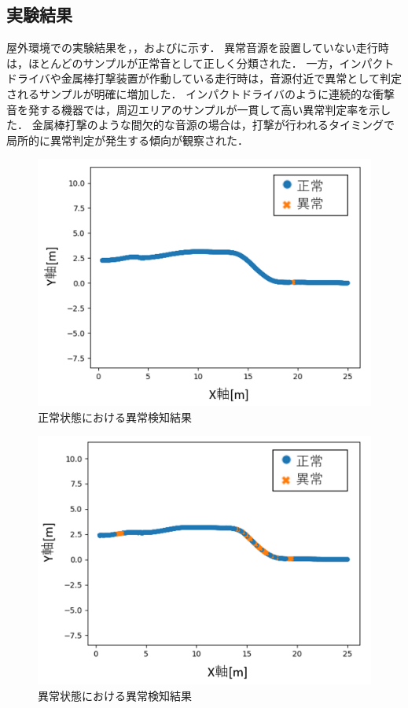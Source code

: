 \documentclass[../main]{subfiles}
\begin{document}
\subsection{実験結果}
\label{subsec:vexp_ci_result}
屋外環境での実験結果を，，およびに示す．
異常音源を設置していない走行時は，ほとんどのサンプルが正常音として正しく分類された．
一方，インパクトドライバや金属棒打撃装置が作動している走行時は，音源付近で異常として判定されるサンプルが明確に増加した．
インパクトドライバのように連続的な衝撃音を発する機器では，周辺エリアのサンプルが一貫して高い異常判定率を示した．
金属棒打撃のような間欠的な音源の場合は，打撃が行われるタイミングで局所的に異常判定が発生する傾向が観察された．
\begin{figure}[t]
  \centering
  \includegraphics[keepaspectratio, width=0.7\linewidth]{chap4/field_normal.png}
  \caption{正常状態における異常検知結果}
  \label{fig:field_normal}
\end{figure}



\begin{figure}[t]
  \centering
  \includegraphics[keepaspectratio, width=0.7\linewidth]{chap4/field_abnormal1.png}
  \caption{異常状態における異常検知結果}
  \label{fig:field_abnormal1}
\end{figure}
\end{document}
